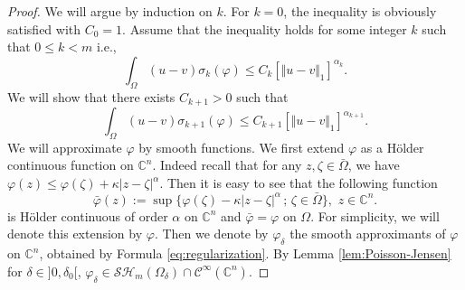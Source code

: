 \documentclass[11pt]{article}
\newcommand{\ie}{i.e.,\xspace}
\providecommand{\C}{}
\numberwithin{equation}{section}
\newcommand{\sep}{\,;\,}
\theoremstyle{definition}
\renewcommand{\C}{\mathbb{C}}
\newcommand{\Cc}{\mathcal{C}}
\theoremstyle{plain}
\theoremstyle{definition}
\begin{document}
\begin{proof}
We will argue by induction on $k$. For $k=0$, the inequality is obviously satisfied with $C_0 = 1$. Assume that the inequality holds for some integer $k$ such that $0 \leq k<m$ \ie
\begin{equation}\label{eq:Hyprec}
\int_{\Omega}( u-v) \sigma_k{(\varphi)}\leq C_{k} \left[\Vert u-v \Vert_1\right]^{\alpha_k}.
\end{equation}
We will show that there exists $C_{k+1} > 0$ such that
\[
\int_{\Omega}(u-v) \sigma_{k+1}(\varphi)\leq C_{k+1} \left[\Vert u-v \Vert_1\right]^{\alpha_{k+1}}.
\]
We will approximate $\varphi$ by smooth functions. We first extend $\varphi$ as a Hölder continuous function on $\C^n$. Indeed recall that for any $z, \zeta \in \bar{\Omega}$, we have $\varphi (z) \leq \varphi (\zeta) + \kappa \vert z - \zeta\vert^\alpha $. Then it is easy to see that the following function
\begin{equation} \label{eq:Holderextension}
\bar{\varphi} (z):= \sup \{\varphi (\zeta) - \kappa \vert z - \zeta\vert^\alpha \sep \zeta \in \bar{\Omega}\}, \, \, z \in \C^n.
\end{equation}
is Hölder continuous of order $\alpha$ on $\C^n$ and $ \bar{\varphi} = \varphi$ on $\Omega$. For simplicity, we will denote this extension by $\varphi$. Then we denote by $\varphi_{\delta}$ the smooth approximants of $\varphi $ on $\C^n$, obtained by Formula \eqref{eq:regularization}. By Lemma \ref{lem:Poisson-Jensen} for $\delta\in{}]0,\delta_0[$, $\varphi_\delta \in \mathcal{SH}_m (\Omega_{\delta})\cap\Cc^{\infty}(\C^n)$.


\end{proof}
\end{document}
